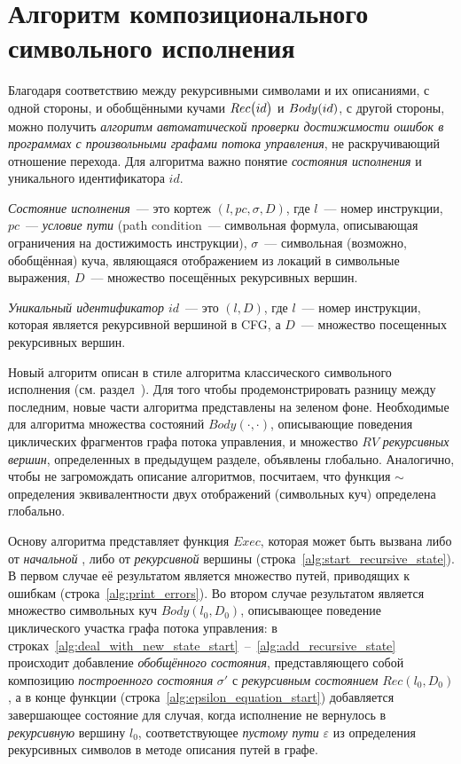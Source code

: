 \section{Алгоритм композиционального символьного исполнения}

Благодаря соответствию между рекурсивными символами и их описаниями, с одной стороны, и обобщёнными кучами $Rec\big(id\big)$ и $Body{}(id)$, с другой стороны, можно 
получить \emph{алгоритм автоматической проверки достижимости ошибок в программах с произвольными графами потока управления}, не раскручивающий отношение перехода. Для алгоритма важно понятие \emph{состояния исполнения} и уникального идентификатора $id$.

\begin{defn}
\emph{Состояние исполнения}~--- это кортеж $(l,pc,\sigma,D)$, где $l$~--- номер инструкции,
$pc$~--- \emph{условие пути} (path condition~--- символьная формула, описывающая ограничения на достижимость инструкции), $\sigma$~--- символьная (возможно, обобщённая) куча, являющаяся отображением из локаций в символьные выражения, $D$~--- множество посещённых рекурсивных вершин.

\emph{Уникальный идентификатор $id$}~--- это $(l,D)$, где $l$~--- номер инструкции, которая является рекурсивной вершиной в CFG, а $D$~--- множество посещенных рекурсивных вершин.
\end{defn}

Новый алгоритм описан в стиле алгоритма классического символьного исполнения (см. раздел~). Для того чтобы продемонстрировать разницу между последним, новые части алгоритма представлены на зеленом фоне. Необходимые для алгоритма множества состояний $Body(\cdot,\cdot)$, описывающие поведения циклических фрагментов графа потока управления, и множество $RV$ \emph{рекурсивных вершин}, определенных в предыдущем разделе, объявлены глобально. Аналогично, чтобы не загромождать описание алгоритмов, посчитаем, что функция $\sim$ определения эквивалентности двух отображений (символьных куч) определена глобально.

Основу алгоритма представляет функция $Exec$, которая может быть вызвана либо от \emph{начальной} , 
либо от \emph{рекурсивной} вершины (строка~\ref{alg:start_recursive_state}). В первом случае её результатом является  множество путей, приводящих к ошибкам (строка~\ref{alg:print_errors}).
Во втором случае результатом является множество символьных куч $Body(l_0,D_0)$, описывающее поведение циклического участка графа потока управления:
в строках~\ref{alg:deal_with_new_state_start}~--~\ref{alg:add_recursive_state} 
происходит добавление \emph{обобщённого состояния}, представляющего собой композицию \emph{построенного состояния} $\sigma'$ с \emph{рекурсивным состоянием} $Rec(l_0,D_0)$, 
а в конце функции (строка~\ref{alg:epsilon_equation_start}) добавляется завершающее состояние для случая, 
когда исполнение не вернулось в \emph{рекурсивную} вершину $l_0$,
соответствующее \emph{пустому пути} $\varepsilon$ из определения рекурсивных символов в методе описания путей в графе.


